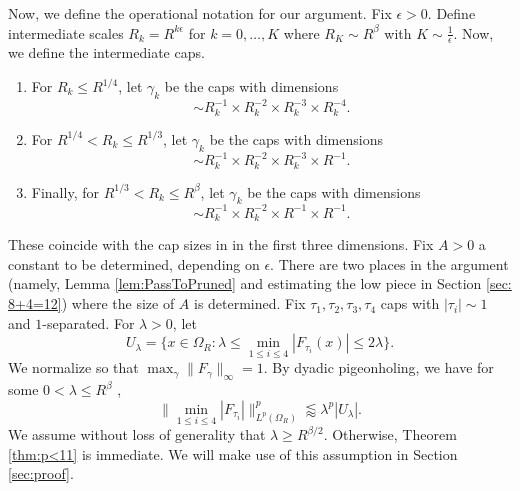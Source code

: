 \documentclass[12pt]{amsart}
\begin{document}
Now, we define the operational notation for our argument. Fix $\epsilon>0$. Define intermediate scales $R_k = R^{k\epsilon}$ for $k=0, \dots, K$ where $R_K\sim R^{\beta}$ with $K\sim \frac{1}{\epsilon}$. Now, we define the intermediate caps. \begin{enumerate}
    \item[i)] For $R_k\le R^{1/4}$, let $\gamma_k$ be the caps with dimensions $$\sim R_k^{-1}\times R_k^{-2}\times R_k^{-3}\times R_k^{-4}.$$

    \item[ii)] For $R^{1/4}<R_k\le R^{1/3}$, let $\gamma_k$ be the caps with dimensions $$\sim R_k^{-1}\times R_k^{-2}\times R_k^{-3}\times R^{-1}.$$

    \item[iii)] Finally, for $R^{1/3}<R_k\le R^{\beta}$, let $\gamma_k$ be the caps with dimensions $$\sim R_k^{-1}\times R_k^{-2}\times R^{-1}\times R^{-1}.$$
\end{enumerate} 
These coincide with the cap sizes in \cite{Guth_2024} in the first three dimensions. Fix $A>0$ a constant to be determined, depending on $\epsilon$. There are two places in the argument (namely, Lemma \ref{lem:PassToPruned} and estimating the low piece in Section \ref{sec: 8+4=12}) where the size of $A$ is determined. Fix $\tau_1, \tau_2, \tau_3, \tau_4$ caps with $|\tau_i|\sim 1$ and $1$-separated. For $\lambda>0$, let $$U_{\lambda} = \{x\in \Omega_R : \lambda\le\min_{1\le i\le 4}|F_{\tau_i}(x)|\le 2\lambda \}.$$ We normalize so that $\max_\gamma\|F_\gamma\|_\infty =1$. By dyadic pigeonholing, we have for some $0<\lambda\le R^{\beta}$ ,
\begin{equation}\label{eq:4-linDyadicPig}
\|\min_{1\le i\le 4}|F_{\tau_i}|\|_{L^{p}(\Omega_R)}^{p}\lessapprox \lambda^p|U_{\lambda}|.
\end{equation} We assume without loss of generality that $\lambda\ge R^{\beta/2}$. Otherwise, Theorem \ref{thm:p<11} is immediate. We will make use of this assumption in Section \ref{sec:proof}.
\end{document}
